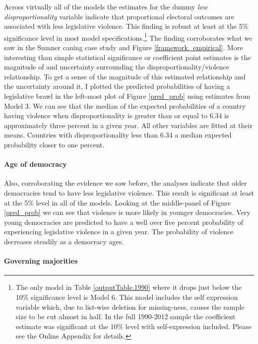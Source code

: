 \documentclass[a4paper]{article}\usepackage[]{graphicx}\usepackage[]{color}
\begin{document}
Across virtually all of the models the estimates for the dummy {\emph{low disproportionality}} variable indicate that proportional electoral outcomes are associated with less legislative violence. This finding is robust at least at the 5\% significance level in most model specifications.\footnote{The only model in Table \ref{outputTable.1990} where it drops just below the 10\% significance level is Model 6. This model includes the self expression variable which, due to list-wise deletion for missing-ness, causes the sample size to be cut almost in half. In the full 1990-2012 sample the coefficient estimate was significant at the 10\% level with self-expression included. Please see the Online Appendix for details.} The finding corroborates what we saw in the Sumner caning case study and Figure \ref{framework_empirical}. More interesting than simple statistical significance or coefficient point estimates is the magnitude of and uncertainty surrounding the disproportionality/violence relationship. To get a sense of the magnitude of this estimated relationship and the uncertainty around it, I plotted the predicted probabilities of having a legislative brawl in the left-most plot of Figure \ref{pred_prob} using estimates from Model 3. We can see that the median of the expected probabilities of a country having violence when disproportionality is greater than or equal to 6.34 is approximately three percent in a given year. All other variables are fitted at their means. Countries with disproportionality less than 6.34 a median expected probability closer to one percent.

\paragraph{Age of democracy}

Also, corroborating the evidence we saw before, the analyses indicate that older democracies tend to have less legislative violence. This result is significant at least at the 5\% level in all of the models. Looking at the middle-panel of Figure \ref{pred_prob} we can see that violence is more likely in younger democracies. Very young democracies are predicted to have a well over five percent probability of experiencing legislative violence in a given year. The probability of violence decreases steadily as a democracy ages.

\paragraph{Governing majorities}
\end{document}
